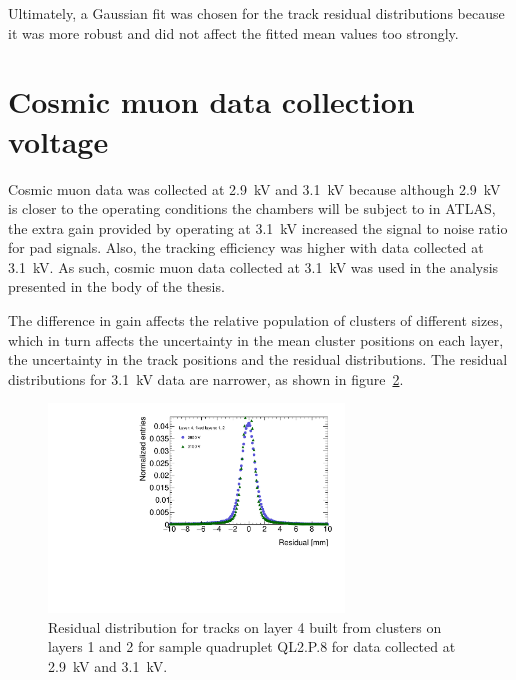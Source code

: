 \begin{figure}
  \caption{}
  \label{fig:double_Gaussian_compare_fits}

\end{figure}
\newpage
\restoregeometry

Ultimately, a Gaussian fit was chosen for the track residual distributions because it was more robust and did not affect the fitted mean values too strongly.

\section{Cosmic muon data collection voltage}
\label{appendix:systematics_2900V_vs_3100V}


Cosmic muon data was collected at 2.9~kV and 3.1~kV because although 2.9~kV is closer to the operating conditions the chambers will be subject to in ATLAS, the extra gain provided by operating at 3.1~kV increased the signal to noise ratio for pad signals. Also, the tracking efficiency was higher with data collected at 3.1~kV. As such, cosmic muon data collected at 3.1~kV was used in the analysis presented in the body of the thesis.

The difference in gain affects the relative population of clusters of different sizes, which in turn affects the uncertainty in the mean cluster positions on each layer, the uncertainty in the track positions and the residual distributions. The residual distributions for 3.1~kV data are narrower, as shown in figure~\ref{fig:res_dist_2900V_3100V_412}.

\begin{figure}
    \centering
    \includegraphics[width = 0.7\textwidth]{figures/figure_residual_distributions_blue_QL2P08_2900V_2021-05-21_green_QL2P08_3100V_2021-05-21_layer4_fixedlayers12.pdf}
    \caption{Residual distribution for tracks on layer 4 built from clusters on layers 1 and 2 for sample quadruplet QL2.P.8 for data collected at 2.9~kV and 3.1~kV.}
    \label{fig:res_dist_2900V_3100V_412}
\end{figure}

